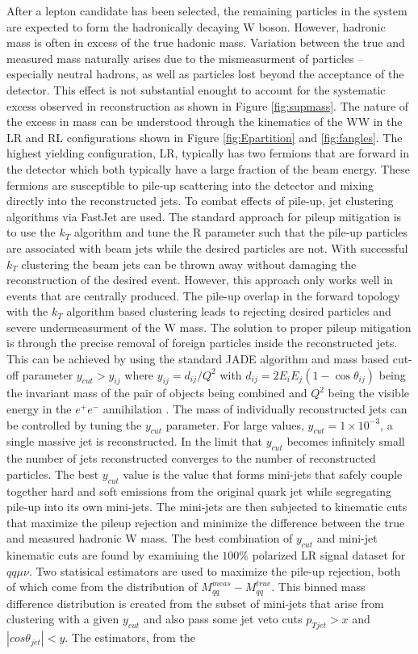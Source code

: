 After a lepton candidate has been selected, the remaining particles in the system are expected to form the hadronically decaying W boson. However, hadronic mass is often in excess of the true hadonic mass. Variation between the true and measured mass naturally arises due to the mismeasurment of particles -- especially neutral hadrons, as well as particles lost beyond the acceptance of the detector. This effect is not substantial enought to account for the systematic excess observed in reconstruction as shown in Figure \ref{fig:supmass}. The nature of the excess in mass can be understood through the kinematics of the WW in the LR and RL configurations shown in Figure \ref{fig:Epartition} and \ref{fig:fangles}. The highest yielding configuration, LR, typically has two fermions that are forward in the detector which both typically have a large fraction of the beam energy. These fermions are susceptible to pile-up scattering into the detector and mixing directly into the reconstructed jets. To combat effects of pile-up, jet clustering algorithms via FastJet\cite{fastjet} are used.  The standard approach for pileup mitigation is to use the $k_T$ algorithm\cite{kt} and tune the R parameter such that the pile-up particles are associated with beam jets while the desired particles are not. With successful $k_T$ clustering the beam jets can be thrown away without damaging the reconstruction of the desired event. However, this approach only works well in events that are centrally produced.  The pile-up overlap in the forward topology with the $k_T$ algorithm  based clustering leads to rejecting desired particles and severe undermeasurment of the W mass. The solution to proper pileup mitigation is through the precise removal of foreign particles inside the reconstructed jets.  This can be achieved by using the standard JADE algorithm and mass based cut-off parameter $y_{cut} > y_{ij}$ where $y_{ij} = d_{ij} / Q^2$ with $d_{ij} = 2E_i E_j(1-\cos\theta_{ij})$ being the invariant mass of the pair of objects being combined and $Q^2$ being the visible energy in the $e^{+}e^{-}$ annihilation \cite{fastjet}.  The mass of individually reconstructed jets can be controlled by tuning the $y_{cut}$ parameter. For large values, $y_{cut} =1\times10^{-3}$, a single massive jet is reconstructed. In the limit that $y_{cut}$ becomes infinitely small the number of jets reconstructed converges to the number of reconstructed particles.  The best $y_{cut}$ value is the value that forms mini-jets that safely couple together hard and soft emissions from  the original quark jet while segregating pile-up into its own mini-jets. The mini-jets are then subjected to kinematic cuts that maximize the pileup rejection and minimize the difference  between the true and measured hadronic W mass. 	The best combination of $y_{cut}$ and mini-jet kinematic cuts are found by examining the $100\%$ polarized LR signal dataset for $qq \mu \nu$.  Two statisical estimators are used to maximize the pile-up rejection, both of which come from the distribution of $M_{qq}^{meas} - M_{qq}^{true}$. This binned mass difference distribution is created from the subset of mini-jets that arise from clustering with a given $y_{cut}$ and also pass some jet veto cuts $p_{Tjet} > x$ and $|cos\theta_{jet}| < y$. The estimators, from the 